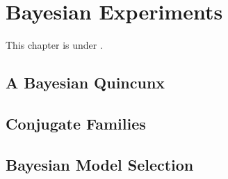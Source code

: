 \chapter{Bayesian Experiments}
This chapter is under \work.

\section{A Bayesian Quincunx}

\section{Conjugate Families}

\section{Bayesian Model Selection}

